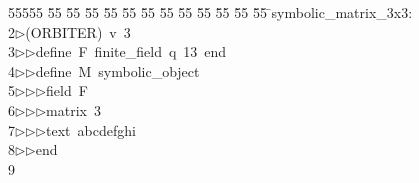 %
%
\begin{tabbing}
55555 \= 55 \= 55 \= 55 \= 55 \= 55 \= 55 \= 55 \= 55 \= 55 \= 55 \= 55 \= 55 \= \>symbolic\_matrix\_3x3:\\[0pt]
2\>$\triangleright$\>(ORBITER)\ v\ 3\ \\[0pt]
3\>$\triangleright$\>$\triangleright$\>define\ F\ finite\_field\ q\ 13\ end\ \\[0pt]
4\>$\triangleright$\>$\triangleright$\>define\ M\ symbolic\_object\ \\[0pt]
5\>$\triangleright$\>$\triangleright$\>$\triangleright$\>field\ F\ \\[0pt]
6\>$\triangleright$\>$\triangleright$\>$\triangleright$\>matrix\ 3\ \\[0pt]
7\>$\triangleright$\>$\triangleright$\>$\triangleright$\>text\ abcdefghi\ \\[0pt]
8\>$\triangleright$\>$\triangleright$\>end\\[0pt]
9\>\end{tabbing}
